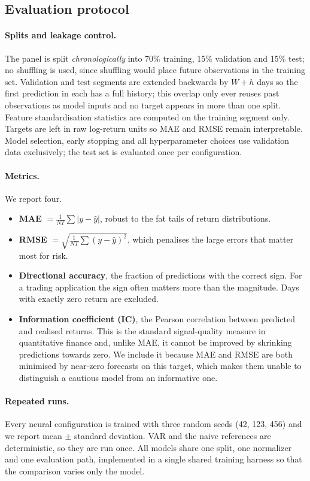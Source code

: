 \subsection{Evaluation protocol}

\paragraph{Splits and leakage control.} The panel is split \emph{chronologically} into 70\% training, 15\% validation and 15\% test; no shuffling is used, since shuffling would place future observations in the training set. Validation and test segments are extended backwards by $W + h$ days so the first prediction in each has a full history; this overlap only ever reuses past observations as model inputs and no target appears in more than one split. Feature standardisation statistics are computed on the training segment only. Targets are left in raw log-return units so MAE and RMSE remain interpretable. Model selection, early stopping and all hyperparameter choices use validation data exclusively; the test set is evaluated once per configuration.

\paragraph{Metrics.} We report four.
\begin{itemize}[nosep]
    \item \textbf{MAE} $=\frac{1}{NT}\sum|y - \hat{y}|$, robust to the fat tails of return distributions.
    \item \textbf{RMSE} $=\sqrt{\frac{1}{NT}\sum(y-\hat{y})^2}$, which penalises the large errors that matter most for risk.
    \item \textbf{Directional accuracy}, the fraction of predictions with the correct sign. For a trading application the sign often matters more than the magnitude. Days with exactly zero return are excluded.
    \item \textbf{Information coefficient (IC)}, the Pearson correlation between predicted and realised returns. This is the standard signal-quality measure in quantitative finance and, unlike MAE, it cannot be improved by shrinking predictions towards zero. We include it because MAE and RMSE are both minimised by near-zero forecasts on this target, which makes them unable to distinguish a cautious model from an informative one.
\end{itemize}

\paragraph{Repeated runs.} Every neural configuration is trained with three random seeds (42, 123, 456) and we report mean $\pm$ standard deviation. VAR and the naive references are deterministic, so they are run once. All models share one split, one normalizer and one evaluation path, implemented in a single shared training harness so that the comparison varies only the model.

